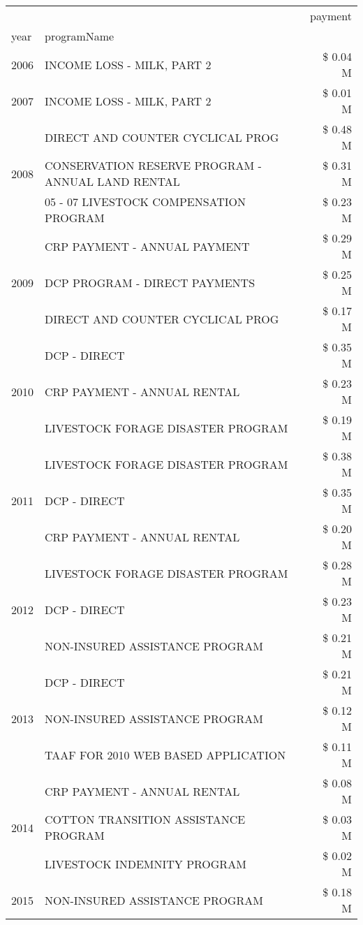 \begin{tabular}{llr}
\toprule
 &  & payment \\
year & programName &  \\
\midrule
2006 & INCOME LOSS - MILK, PART 2 & \$ 0.04 M \\
\cline{1-3}
2007 & INCOME LOSS - MILK, PART 2 & \$ 0.01 M \\
\cline{1-3}
\multirow[t]{3}{*}{2008} & DIRECT AND COUNTER CYCLICAL PROG & \$ 0.48 M \\
 & CONSERVATION RESERVE PROGRAM - ANNUAL LAND RENTAL & \$ 0.31 M \\
 & 05 - 07 LIVESTOCK COMPENSATION PROGRAM & \$ 0.23 M \\
\cline{1-3}
\multirow[t]{3}{*}{2009} & CRP PAYMENT - ANNUAL PAYMENT & \$ 0.29 M \\
 & DCP PROGRAM - DIRECT PAYMENTS & \$ 0.25 M \\
 & DIRECT AND COUNTER CYCLICAL PROG & \$ 0.17 M \\
\cline{1-3}
\multirow[t]{3}{*}{2010} & DCP - DIRECT & \$ 0.35 M \\
 & CRP PAYMENT - ANNUAL RENTAL & \$ 0.23 M \\
 & LIVESTOCK FORAGE DISASTER PROGRAM & \$ 0.19 M \\
\cline{1-3}
\multirow[t]{3}{*}{2011} & LIVESTOCK FORAGE DISASTER PROGRAM & \$ 0.38 M \\
 & DCP - DIRECT & \$ 0.35 M \\
 & CRP PAYMENT - ANNUAL RENTAL & \$ 0.20 M \\
\cline{1-3}
\multirow[t]{3}{*}{2012} & LIVESTOCK FORAGE DISASTER PROGRAM & \$ 0.28 M \\
 & DCP - DIRECT & \$ 0.23 M \\
 & NON-INSURED ASSISTANCE PROGRAM & \$ 0.21 M \\
\cline{1-3}
\multirow[t]{3}{*}{2013} & DCP - DIRECT & \$ 0.21 M \\
 & NON-INSURED ASSISTANCE PROGRAM & \$ 0.12 M \\
 & TAAF FOR 2010 WEB BASED APPLICATION & \$ 0.11 M \\
\cline{1-3}
\multirow[t]{3}{*}{2014} & CRP PAYMENT - ANNUAL RENTAL & \$ 0.08 M \\
 & COTTON TRANSITION ASSISTANCE PROGRAM & \$ 0.03 M \\
 & LIVESTOCK INDEMNITY PROGRAM & \$ 0.02 M \\
\cline{1-3}
\multirow[t]{3}{*}{2015} & NON-INSURED ASSISTANCE PROGRAM & \$ 0.18 M \\

\end{tabular}
